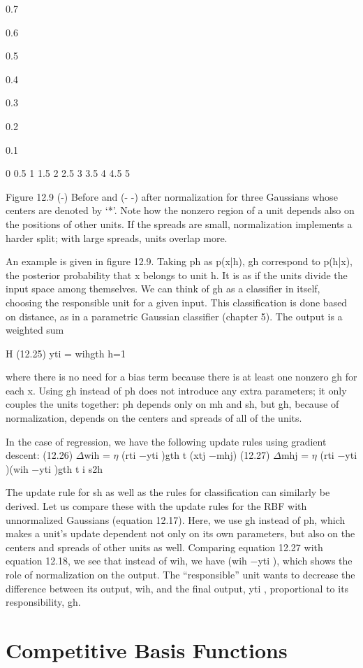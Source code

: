 0.7

0.6

0.5

0.4

0.3

0.2

0.1

0 0.5 1 1.5 2 2.5 3 3.5 4 4.5 5

Figure 12.9 (-) Before and (- -) after normalization for three Gaussians whose centers are denoted by ‘*’. Note how the nonzero region of a unit depends also on the positions of other units. If the spreads are small, normalization implements a harder split; with large spreads, units overlap more.

An example is given in figure 12.9. Taking ph as p(x|h), gh correspond to p(h|x), the posterior probability that x belongs to unit h. It is as if the units divide the input space among themselves. We can think of gh as a classifier in itself, choosing the responsible unit for a given input. This classification is done based on distance, as in a parametric Gaussian classifier (chapter 5). The output is a weighted sum

H (12.25) yti = wihgth h=1

where there is no need for a bias term because there is at least one nonzero gh for each x. Using gh instead of ph does not introduce any extra parameters; it only couples the units together: ph depends only on mh and sh, but gh, because of normalization, depends on the centers and spreads of all of the units.

In the case of regression, we have the following update rules using gradient descent: (12.26) $\Delta$wih = $\eta$ (rti $-$yti )gth t (xtj $-$mhj) (12.27) $\Delta$mhj = $\eta$ (rti $-$yti )(wih $-$yti )gth t i s2h

The update rule for sh as well as the rules for classification can similarly be derived. Let us compare these with the update rules for the RBF with unnormalized Gaussians (equation 12.17). Here, we use gh instead of ph, which makes a unit’s update dependent not only on its own parameters, but also on the centers and spreads of other units as well. Comparing equation 12.27 with equation 12.18, we see that instead of wih, we have (wih $-$yti ), which shows the role of normalization on the output. The “responsible” unit wants to decrease the difference between its output, wih, and the final output, yti , proportional to its responsibility, gh.

\section{Competitive Basis Functions}

